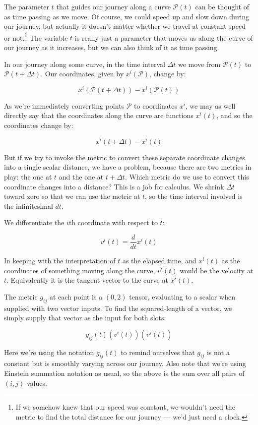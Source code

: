 The parameter $t$ that guides our journey along a curve $\mathcal{P}(t)$ can be thought of as time passing as we move. Of course, we could speed up and slow down during our journey, but actually it doesn't matter whether we travel at constant speed or not.\footnote{If we somehow knew that our speed was constant, we wouldn't need the metric to find the total distance for our journey --- we'd just need a clock.} The variable $t$ is really just a parameter that moves us along the curve of our journey as it increases, but we can also think of it as time passing.

In our journey along some curve, in the time interval $\Delta t$ we move from $\mathcal{P}(t)$ to $\mathcal{P}(t + \Delta t)$. Our coordinates, given by $x^i(\mathcal{P})$, change by:

$$
x^i(\mathcal{P}(t + \Delta t))
-
x^i(\mathcal{P}(t))
$$

As we're immediately converting points $\mathcal{P}$ to coordinates $x^i$, we may as well directly say that the coordinates along the curve are functions $x^i(t)$, and so the coordinates change by:

$$
x^i(t + \Delta t)
-
x^i(t)
$$

But if we try to invoke the metric to convert these separate coordinate changes into a single scalar distance, we have a problem, because there are two metrics in play: the one at $t$ and the one at $t + \Delta t$. Which metric do we use to convert this coordinate changes into a distance? This is a job for calculus. We shrink $\Delta t$ toward zero so that we can use the metric at $t$, so the time interval involved is the infinitesimal $dt$.

We differentiate the $i$th coordinate with respect to $t$:

$$
v^i(t) = \frac{d}{dt} x^i(t)
$$

In keeping with the interpretation of $t$ as the elapsed time, and $x^i(t)$ as the coordinates of something moving along the curve, $v^i(t)$ would be the velocity at $t$. Equivalently it is the tangent vector to the curve at $x^i(t)$.

The metric $g_{ij}$ at each point is a $(0, 2)$ tensor, evaluating to a scalar when supplied with two vector inputs. To find the squared-length of a vector, we simply supply that vector as the input for both slots:

$$
g_{ij}(t)
\left( v^i(t) \right) 
\left( v^j(t) \right)
$$

Here we're using the notation $g_{ij}(t)$ to remind ourselves that $g_{ij}$ is not a constant but is smoothly varying across our journey. Also note that we're using Einstein summation notation as usual, so the above is the sum over all pairs of $(i, j)$ values.

